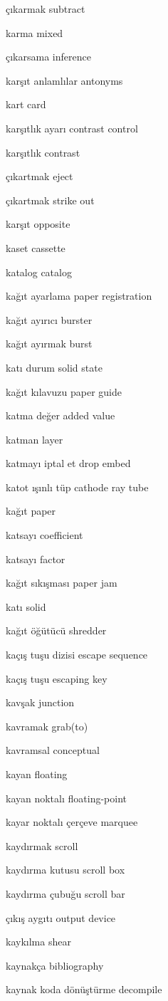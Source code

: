 \documentclass[12pt,fleqn]{article}\usepackage{../../common}
\begin{document}
çıkarmak subtract

karma mixed

çıkarsama inference

karşıt anlamlılar antonyms

kart card

karşıtlık ayarı contrast control

karşıtlık contrast

çıkartmak eject

çıkartmak strike out

karşıt opposite

kaset cassette

katalog catalog

kağıt ayarlama paper registration

kağıt ayırıcı burster

kağıt ayırmak burst

katı durum solid state

kağıt kılavuzu paper guide

katma değer added value

katman layer

katmayı iptal et drop embed

katot ışınlı tüp cathode ray tube

kağıt paper

katsayı coefficient

katsayı factor

kağıt sıkışması paper jam

katı solid

kağıt öğütücü shredder

kaçış tuşu dizisi escape sequence

kaçış tuşu escaping key

kavşak junction

kavramak grab(to)

kavramsal conceptual

kayan floating

kayan noktalı floating-point

kayar noktalı çerçeve marquee

kaydırmak scroll

kaydırma kutusu scroll box

kaydırma çubuğu scroll bar

çıkış aygıtı output device

kaykılma shear

kaynakça bibliography

kaynak koda dönüştürme decompile
\end{document}
